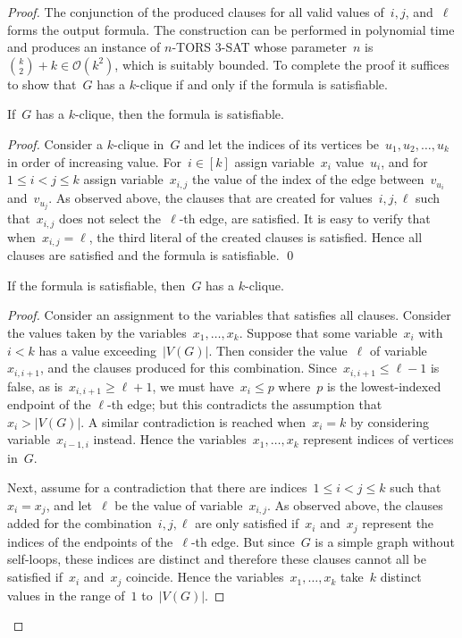 \let\accentvec\vec  \documentclass{llncs}
\newcommand{\claimqed}{\renewcommand{\squareforqed}{$\lrcorner$}\qed\renewcommand{\squareforqed}{\plainsquareforqed}}
\newcommand{\Oh}{{\mathcal{O}}}
\newcommand{\nTORSThreeSat}{\textsc{$n$-TORS 3-SAT}\xspace}
\begin{document}
\begin{proof}
The conjunction of the produced clauses for all valid values of~$i,j$, and~$\ell$ forms the output formula. The construction can be performed in polynomial time and produces an instance of \nTORSThreeSat whose parameter~$n$ is~$\binom{k}{2} + k \in \Oh(k^2)$, which is suitably bounded. To complete the proof it suffices to show that~$G$ has a $k$-clique if and only if the formula is satisfiable.

\begin{claim}
If~$G$ has a $k$-clique, then the formula is satisfiable.
\end{claim}
\begin{proof}
Consider a $k$-clique in~$G$ and let the indices of its vertices be~$u_1, u_2, \ldots, u_k$ in order of increasing value. For~$i \in [k]$ assign variable~$x_i$ value~$u_i$, and for~$1 \leq i < j \leq k$ assign variable~$x_{i,j}$ the value of the index of the edge between~$v_{u_i}$ and~$v_{u_j}$. As observed above, the clauses that are created for values~$i,j,\ell$ such that~$x_{i,j}$ does not select the~$\ell$-th edge, are satisfied. It is easy to verify that when~$x_{i,j} = \ell$, the third literal of the created clauses is satisfied. Hence all clauses are satisfied and the formula is satisfiable.
\claimqed
\end{proof}

\begin{claim}
If the formula is satisfiable, then~$G$ has a $k$-clique.
\end{claim}
\begin{proof}
Consider an assignment to the variables that satisfies all clauses. Consider the values taken by the variables~$x_1, \ldots, x_k$. Suppose that some variable~$x_i$ with~$i<k$ has a value exceeding~$|V(G)|$. Then consider the value~$\ell$ of variable~$x_{i,i+1}$, and the clauses produced for this combination. Since~$x_{i,i+1} \leq \ell - 1$ is false, as is~$x_{i,i+1} \geq \ell+1$, we must have~$x_i \leq p$ where~$p$ is the lowest-indexed endpoint of the $\ell$-th edge; but this contradicts the assumption that~$x_i > |V(G)|$. A similar contradiction is reached when~$x_i = k$ by considering variable~$x_{i-1, i}$ instead. Hence the variables~$x_1, \ldots, x_k$ represent indices of vertices in~$G$. 

Next, assume for a contradiction that there are indices~$1 \leq i < j \leq k$ such that~$x_i = x_j$, and let~$\ell$ be the value of variable~$x_{i,j}$. As observed above, the clauses added for the combination~$i,j,\ell$ are only satisfied if~$x_i$ and~$x_j$ represent the indices of the endpoints of the~$\ell$-th edge. But since~$G$ is a simple graph without self-loops, these indices are distinct and therefore these clauses cannot all be satisfied if~$x_i$ and~$x_j$ coincide. Hence the variables~$x_1, \ldots, x_k$ take~$k$ distinct values in the range of~$1$ to~$|V(G)|$.


\end{proof}
\end{proof}
\end{document}

